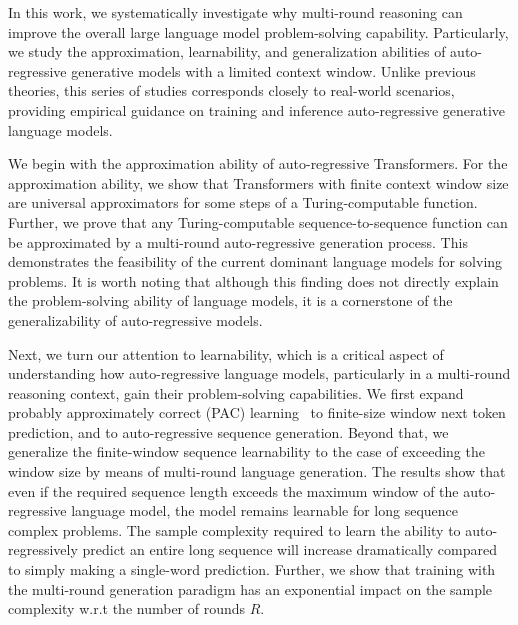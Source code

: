 In this work, we systematically investigate why multi-round reasoning can improve the overall large language model problem-solving capability. Particularly, we study the approximation, learnability, and generalization abilities of auto-regressive generative models with a limited context window. Unlike previous theories, this series of studies corresponds closely to real-world scenarios, providing empirical guidance on training and inference auto-regressive generative language models.

We begin with the approximation ability of auto-regressive Transformers. For the approximation ability, we show that Transformers with finite context window size are universal approximators for some steps of a Turing-computable function. Further, we prove that any Turing-computable sequence-to-sequence function can be approximated by a multi-round auto-regressive generation process. This demonstrates the feasibility of the current dominant language models for solving problems. It is worth noting that although this finding does not directly explain the problem-solving ability of language models, it is a cornerstone of the generalizability of auto-regressive models.

Next, we turn our attention to learnability, which is a critical aspect of understanding how auto-regressive language models, particularly in a multi-round reasoning context, gain their problem-solving capabilities. We first expand probably approximately correct (PAC) learning~\citep{valiant1984theory} to finite-size window next token prediction, {\color{black}and to auto-regressive sequence generation}. Beyond that, we generalize the finite-window sequence learnability to the case of exceeding the window size by means of multi-round language generation. The results show that even if the required sequence length exceeds the maximum window of the auto-regressive language model, the model remains learnable for long sequence complex problems. The sample complexity required to learn the ability to auto-regressively predict an entire long sequence will increase dramatically compared to simply making a single-word prediction. Further, we show that training with the multi-round generation paradigm has an exponential impact on the sample complexity w.r.t the number of rounds {\color{black}\(R\)}. %

